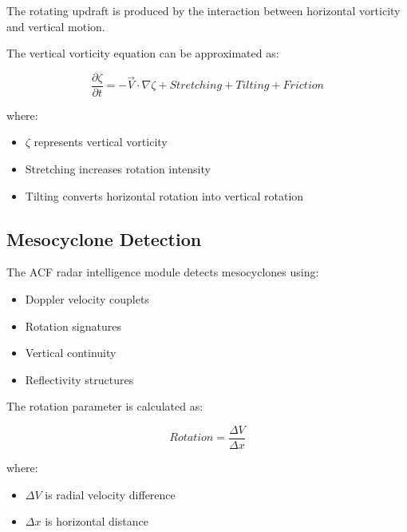 The rotating updraft is produced by the interaction between horizontal
vorticity and vertical motion.

The vertical vorticity equation can be approximated as:

\[
\frac{\partial \zeta}{\partial t}
=
-\vec{V}\cdot\nabla\zeta
+
Stretching
+
Tilting
+
Friction
\]

where:

\begin{itemize}

\item $\zeta$ represents vertical vorticity

\item Stretching increases rotation intensity

\item Tilting converts horizontal rotation into vertical rotation

\end{itemize}


\subsection{Mesocyclone Detection}

The ACF radar intelligence module detects mesocyclones using:

\begin{itemize}

\item Doppler velocity couplets

\item Rotation signatures

\item Vertical continuity

\item Reflectivity structures

\end{itemize}


The rotation parameter is calculated as:

\[
Rotation =
\frac{\Delta V}{\Delta x}
\]

where:

\begin{itemize}

\item $\Delta V$ is radial velocity difference

\item $\Delta x$ is horizontal distance

\end{itemize}

